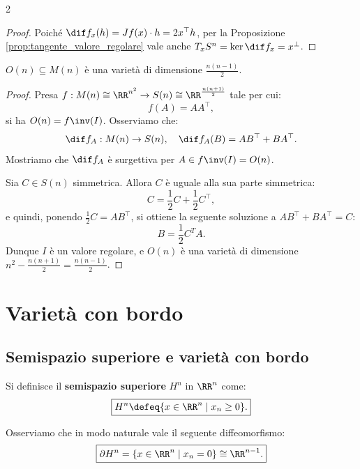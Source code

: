 \begin{multicols*}{2}
\begin{proof}
        Poiché $\dif f_x(h) = Jf(x) \cdot h = 2x^\top h$, per la
        Proposizione \ref{prop:tangente_valore_regolare} vale
        anche $T_x S^n = \ker \dif f_x = x^\perp$.
    \end{proof}

    \begin{corollary}
        $O(n) \subseteq M(n)$ è una varietà di dimensione $\frac{n(n-1)}{2}$.
    \end{corollary}

    \begin{proof}
        Presa $f : M(n) \cong \RR^{n^2} \to S(n) \cong \RR^{\frac{n(n+1)}{2}}$ tale per cui:
        \[ f(A) = AA^\top, \]
        si ha $O(n) = f\inv(I)$. Osserviamo che:
        \[ \dif f_A : M(n) \to S(n), \quad \dif f_A(B) = AB^\top + B A^\top. \]
        Mostriamo che $\dif f_A$ è surgettiva per $A \in f\inv(I) = O(n)$. \smallskip

        Sia $C \in S(n)$ simmetrica. Allora $C$ è uguale
        alla sua parte simmetrica:
        \[
            C = \frac{1}{2} C + \frac{1}{2} C^\top,
        \]
        e quindi, ponendo $\frac{1}{2} C = AB^\top$, si ottiene la seguente
        soluzione a $AB^\top + BA^\top = C$:
        \[
            B = \frac{1}{2} C^TA.
        \]
        Dunque $I$ è un valore regolare, e $O(n)$ è una varietà
        di dimensione $n^2 - \frac{n(n+1)}{2} = \frac{n(n-1)}{2}$.
    \end{proof}

    \section{Varietà con bordo}

    \subsection{Semispazio superiore e varietà con bordo}

    \begin{definition}
        Si definisce il \textbf{semispazio superiore} $H^n$ in $\RR^n$ come:
        \[
            \boxed{H^n \defeq \{x \in \RR^n \mid x_n \geq 0\}.}
        \]
    \end{definition}

    \begin{remark} \label{rmk:hn_diffeo_rn-1}
        Osserviamo che in modo naturale vale il seguente diffeomorfismo:
        \[
            \boxed{\partial H^n = \{ x \in \RR^n \mid x_n = 0 \} \cong \RR^{n-1}.}
        \]
    \end{remark}


\end{multicols*}

